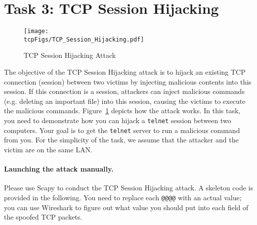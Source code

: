\begin{comment}
Your task is to disrupt the video streaming by breaking the 
TCP connection between the victim and the content server.
You can let the victim user browse the video-streaming 
site from another (virtual) machine or from the same (virtual) machine
as the attacker. Please be noted that, to avoid liability issues,
any attacking packets should be targeted 
at the victim machine (which is the machine run by yourself), 
not at the content server machine (which does not belong to you).

\end{comment}

            


\section{Task 3: TCP Session Hijacking}



\begin{figure}[htb]
  \begin{center}
    \texttt{[image: \\tcpFigs/TCP\_Session\_Hijacking.pdf]}
  \end{center}
  \caption{TCP Session Hijacking Attack}
  \label{tcp:fig:hijacking}
\end{figure}
 
   
The objective of the TCP Session Hijacking attack is to hijack an 
existing TCP connection (session) between two victims by injecting malicious contents
into this session. If this connection is a \telnet session, attackers
can inject malicious commands (e.g. deleting an important file) 
into this session, causing the victims 
to execute the malicious commands. 
Figure~\ref{tcp:fig:hijacking} depicts how the attack works.
In this task, you need to demonstrate how you can hijack a 
\texttt{telnet} session between two computers. Your goal is to get the
\texttt{telnet} server to run a malicious command from you.
For the simplicity of the task, we assume that 
the attacker and the victim are on the same LAN.


\paragraph{Launching the attack manually.}
Please use Scapy to conduct the TCP Session Hijacking attack.
A skeleton code is provided in the following. You need to replace each
\texttt{@@@@} with an actual value; you can use Wireshark to figure out what value you 
should put into each field of the spoofed TCP packets. 


